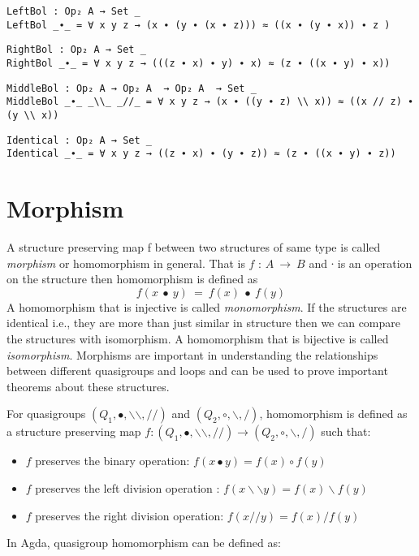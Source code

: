 \begin{verbatim}
LeftBol : Op₂ A → Set _
LeftBol _∙_ = ∀ x y z → (x ∙ (y ∙ (x ∙ z))) ≈ ((x ∙ (y ∙ x)) ∙ z )
\end{verbatim}
\begin{verbatim}
RightBol : Op₂ A → Set _
RightBol _∙_ = ∀ x y z → (((z ∙ x) ∙ y) ∙ x) ≈ (z ∙ ((x ∙ y) ∙ x))
\end{verbatim}
\begin{verbatim}
MiddleBol : Op₂ A → Op₂ A  → Op₂ A  → Set _
MiddleBol _∙_ _\\_ _//_ = ∀ x y z → (x ∙ ((y ∙ z) \\ x)) ≈ ((x // z) ∙ (y \\ x))
\end{verbatim}
\begin{verbatim}
Identical : Op₂ A → Set _
Identical _∙_ = ∀ x y z → ((z ∙ x) ∙ (y ∙ z)) ≈ (z ∙ ((x ∙ y) ∙ z))
\end{verbatim}

\section{Morphism}
A structure preserving map f between two structures of same type is called
\textit{morphism} or homomorphism in general. That is \(f\) : \(A \ \rightarrow \
B\) and ∙ is an operation on the structure then homomorphism is defined as
\[f(x\  ∙ \  y) \ = \ f(x) \ ∙ \  f(y)\] A homomorphism that is injective is
called \textit{monomorphism}. If the structures are identical i.e., they are
more than just similar in structure then we can compare the structures with
isomorphism. A homomorphism that is bijective is called \textit{isomorphism}.
Morphisms are important in understanding the relationships between different
quasigroups and loops and can be used to prove important theorems about these
structures.

For quasigroups $(Q_1,∙,\backslash \backslash ,//)$ and $(Q_2,\circ,\backslash ,/)$,
homomorphism is defined as a structure preserving map \( f:(Q_1,∙,\backslash
\backslash,//) \rightarrow (Q_2,\circ,\backslash,/) \) such that:
\begin{itemize}
  \item $f$ preserves the binary operation: $f(x∙y) = f(x) \circ f(y)$
  \item $f$ preserves the left division operation : $f(x\backslash \backslash y) = f(x)\backslash f(y)$
  \item $f$ preserves the right division operation: $f(x//y) = f(x)/f(y)$
\end{itemize}
In Agda, quasigroup homomorphism can be defined as:

